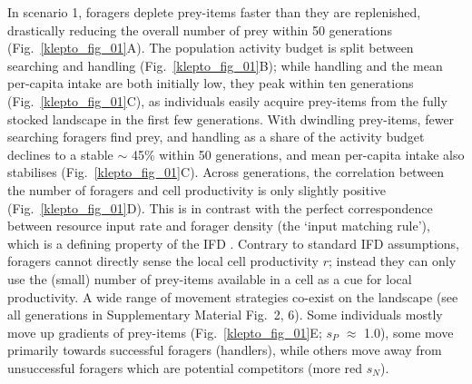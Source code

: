 In scenario 1, foragers deplete prey-items faster than they are replenished, drastically reducing the overall number of prey within 50 generations (Fig.~\ref{klepto_fig_01}A).
The population activity budget is split between searching and handling (Fig.~\ref{klepto_fig_01}B); while handling and the mean per-capita intake are both initially low, they peak within ten generations (Fig.~\ref{klepto_fig_01}C), as individuals easily acquire prey-items from the fully stocked landscape in the first few generations.
With dwindling prey-items, fewer searching foragers find prey, and handling as a share of the activity budget declines to a stable $\sim$ 45\% within 50 generations, and mean per-capita intake also stabilises (Fig.~\ref{klepto_fig_01}C).
Across generations, the correlation between the number of foragers and cell productivity is only slightly positive (Fig.~\ref{klepto_fig_01}D).
This is in contrast with the perfect correspondence between resource input rate and forager density (the `input matching rule'), which is a defining property of the IFD \parencite{parker1978, houston2008}.
Contrary to standard IFD assumptions, foragers cannot directly sense the local cell productivity $r$; instead they can only use the (small) number of prey-items available in a cell as a cue for local productivity.
A wide range of movement strategies co-exist on the landscape (see all generations in Supplementary Material Fig.~2, 6).
Some individuals mostly move up gradients of prey-items (Fig.~\ref{klepto_fig_01}E; $s_P$ $\approx$ 1.0), some move primarily towards successful foragers (handlers), while others move away from unsuccessful foragers which are potential competitors (more red $s_N$).

